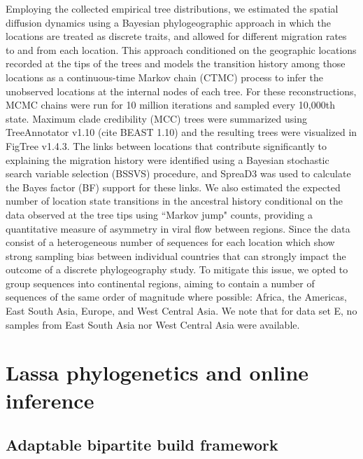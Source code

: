 Employing the collected empirical tree distributions, we estimated the spatial diffusion dynamics using a Bayesian phylogeographic approach in which the locations are treated as discrete traits, and allowed for different migration rates to and from each location.
This approach conditioned on the geographic locations recorded at the tips of the trees and models the transition history among those locations as a continuous-time Markov chain (CTMC) process to infer the unobserved locations at the internal nodes of each tree.
For these reconstructions, MCMC chains were run for 10 million iterations and sampled every 10,000th state.
Maximum clade credibility (MCC) trees were summarized using TreeAnnotator v1.10 (cite BEAST 1.10) and the resulting trees were visualized in FigTree v1.4.3.
The links between locations that contribute significantly to explaining the migration history were identified using a Bayesian stochastic search variable selection (BSSVS) procedure, and SpreaD3 %
was used to calculate the Bayes factor (BF) support for these links.
We also estimated the expected number of location state transitions in the ancestral history conditional on the data observed at the tree tips using ``Markov jump" counts, providing a quantitative measure of asymmetry in viral flow between regions.
Since the data consist of a heterogeneous number of sequences for each location which show strong sampling bias between individual countries that can strongly impact the outcome of a discrete phylogeography study.
To mitigate this issue, we opted to group sequences into continental regions, aiming to contain a number of sequences of the same order of magnitude where possible: Africa, the Americas, East South Asia, Europe, and West Central Asia. %
We note that for data set E, no samples from East South Asia nor West Central Asia were available.




\section{Lassa phylogenetics and online inference}

\subsection{Adaptable bipartite build framework}

